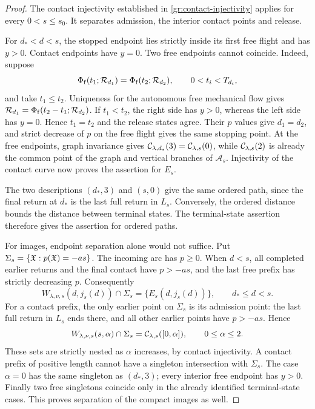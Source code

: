 \begin{proof}
The contact injectivity established in
\eqref{gr:contact-injectivity} applies for every $0<s\le s_0$.
It separates admission, the interior contact points and release.

For $d_*<d<s$, the stopped endpoint lies strictly inside its first
free flight and has $y>0$. Contact endpoints have $y=0$.
Two free endpoints cannot coincide. Indeed, suppose
\[
 \Phi_{\rm f}(t_1;\mathcal R_{d_1})
   =\Phi_{\rm f}(t_2;\mathcal R_{d_2}),
 \qquad 0<t_i<T_{d_i},
\]
and take $t_1\le t_2$. Uniqueness for the autonomous free mechanical
flow gives
$\mathcal R_{d_1}=\Phi_{\rm f}(t_2-t_1;\mathcal R_{d_2})$.
If $t_1<t_2$, the right side has $y>0$, whereas the left side has
$y=0$. Hence $t_1=t_2$ and the release states agree. Their $p$ values
give $d_1=d_2$, and strict decrease of $p$ on the free flight gives
the same stopping point. At the free endpoints, graph invariance
gives $\mathcal C_{\lambda,d_*}(3)=\mathcal C_{\lambda,s}(0)$, while
$\mathcal C_{\lambda,s}(2)$ is already the common point of the graph and
vertical branches of $\mathcal A_s$. Injectivity of the contact curve
now proves the assertion for $E_s$.

The two descriptions $(d_*,3)$ and $(s,0)$ give the same ordered
path, since the final return at $d_*$ is the last full return in
$L_s$. Conversely, the ordered distance bounds the distance
between terminal states. The terminal-state assertion therefore gives
the assertion for ordered paths.

For images, endpoint separation alone would not suffice. Put
$\Sigma_s=\{\mathfrak X:p(\mathfrak X)=-as\}$. The incoming arc has $p\ge0$.
When $d<s$, all completed earlier returns and the final contact have
$p>-as$, and the last free prefix has strictly decreasing $p$.
Consequently
\[
 W_{\lambda,\nu,s}(d,j_s(d))\cap\Sigma_s
          =\{E_s(d,j_s(d))\},\qquad d_*\le d<s.
\]
For a contact prefix, the only earlier point on $\Sigma_s$ is its
admission point: the last full return in $L_s$ ends there, and all
other earlier points have $p>-as$. Hence
\[
 W_{\lambda,\nu,s}(s,\alpha)\cap\Sigma_s
       =\mathcal C_{\lambda,s}([0,\alpha]),\qquad0\le\alpha\le2.
\]
These sets are strictly nested as $\alpha$ increases, by contact
injectivity. A contact prefix of positive length cannot have a
singleton intersection with $\Sigma_s$. The case $\alpha=0$ has
the same singleton as $(d_*,3)$; every interior free endpoint has
$y>0$. Finally two free singletons coincide only in the already
identified terminal-state cases. This proves separation of the
compact images as well.
\end{proof}

